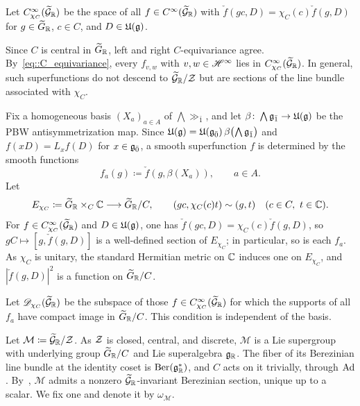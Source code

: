 \begin{definition}
Let $C^\infty_{\chi_C}(\widetilde{{\mathcal{G}}}_{{\mathbb R}})$ be the space of all $f\in C^\infty(\widetilde{{\mathcal{G}}}_{{\mathbb R}})$ with $\check f(gc,D)=\chi_C(c)\check f(g,D)$ for $g\in\widetilde{G}_{{\mathbb R}}$, $c\in C$, and $D\in{\mathfrak U}({\mathfrak{g}})$.
\end{definition}

Since $C$ is central in $\widetilde{G}_{{\mathbb R}}$, left and right $C$-equivariance agree. By~\eqref{eq::C_equivariance}, every $f_{v,w}$ with $v,w\in{\mathscr{H}}^\infty$ lies in $C^\infty_{\chi_C}(\widetilde{{\mathcal{G}}}_{{\mathbb R}})$. In general, such superfunctions do not descend to $\widetilde{{\mathcal{G}}}_{{\mathbb R}}/{\mathcal{Z}}$ but are sections of the line bundle associated with $\chi_C$.

Fix a homogeneous basis $(X_{a})_{a\in A}$ of $\bigwedge\gg_{\bar1}$, and let $\beta\colon\bigwedge{\mathfrak{g}}_{\bar1}\to{\mathfrak U}({\mathfrak{g}})$ be the PBW antisymmetrization map. Since ${\mathfrak U}({\mathfrak{g}})={\mathfrak U}({\mathfrak{g}_{\bar{0}}})\,\beta\bigl(\bigwedge{\mathfrak{g}}_{\bar1}\bigr)$ and $f(xD)=L_xf(D)$ for $x\in{\mathfrak{g}_{\bar{0}}}$, a smooth superfunction $f$ is determined by the smooth functions
\begin{equation}\label{eq::coefficient_functions}
f_a(g)\coloneqq\check f(g,\beta(X_{a})),
\qquad a\in A.
\end{equation}
Let
\begin{equation}
E_{\chi_C}
\coloneqq
\widetilde{G}_{{\mathbb R}}\times_C{\mathbb C}
\longrightarrow
\widetilde{G}_{{\mathbb R}}/C,
\qquad
(gc,\chi_C(c)t)\sim(g,t)
\quad(c\in C,\ t\in{\mathbb C}).
\end{equation}
For $f\in C^\infty_{\chi_C}(\widetilde{{\mathcal{G}}}_{{\mathbb R}})$ and $D\in{\mathfrak U}({\mathfrak{g}})$, one has $\check f(gc,D)=\chi_C(c)\check f(g,D)$, so $gC\mapsto[g,\check f(g,D)]$ is a well-defined section of $E_{\chi_C}$; in particular, so is each $f_a$. As $\chi_C$ is unitary, the standard Hermitian metric on ${\mathbb C}$ induces one on $E_{\chi_C}$, and $|\check f(g,D)|^2$ is a function on $\widetilde{G}_{{\mathbb R}}/C$.

Let $\mathscr D_{\chi_C}(\widetilde{{\mathcal{G}}}_{{\mathbb R}})$ be the subspace of those $f\in C^\infty_{\chi_C}(\widetilde{{\mathcal{G}}}_{{\mathbb R}})$ for which the supports of all $f_a$ have compact image in $\widetilde{G}_{{\mathbb R}}/C$. This condition is independent of the basis.

Let $\mathcal M\coloneqq\widetilde{{\mathcal{G}}}_{{\mathbb R}}/{\mathcal{Z}}$. As ${\mathcal{Z}}$ is closed, central, and discrete, $\mathcal M$ is a Lie supergroup with underlying group $\widetilde{G}_{{\mathbb R}}/C$ and Lie superalgebra ${\mathfrak{g}}_{{\mathbb R}}$. The fiber of its Berezinian line bundle at the identity coset is $\operatorname{Ber}({\mathfrak{g}}_{{\mathbb R}}^{\ast})$, and $C$ acts on it trivially, through $\operatorname{Ad}$. By~\cite[Theorem~4.13]{Alldridge_Hilgert}, $\mathcal M$ admits a nonzero $\widetilde{{\mathcal{G}}}_{{\mathbb R}}$-invariant Berezinian section, unique up to a scalar. We fix one and denote it by $\omega_{\mathcal M}$.


